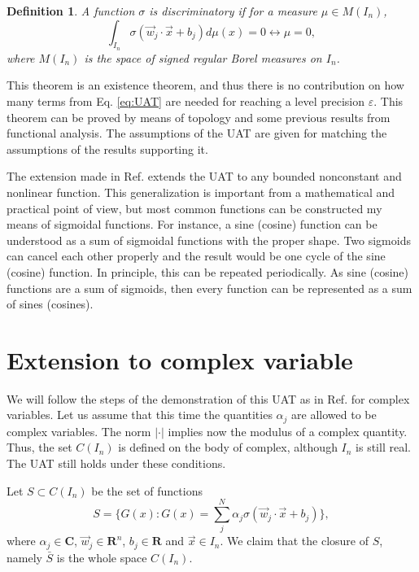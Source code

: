 \documentclass[aps,amssymb,amsmath,amsfonts,pra,superscriptaddress,twocolumn]{revtex4}
\newtheorem{definition}{Definition}
\begin{document}
\begin{definition}
A function $\sigma$ is discriminatory if for a measure $\mu \in M(I_n)$, 
\begin{equation}
    \int_{I_n} \sigma(\vec w_j \cdot \vec x + b_j) d\mu(x) = 0 \leftrightarrow \mu = 0, 
\end{equation}
where $M(I_n)$ is the space of signed regular Borel measures on $I_n$.
\end{definition}

This theorem is an existence theorem, and thus there is no contribution on how many terms from Eq. \eqref{eq:UAT} are needed for reaching a level precision $\varepsilon$. This theorem can be proved by means of topology and some previous results from functional analysis. The assumptions of the UAT are given for matching the assumptions of the results supporting it. 

The extension made in Ref. \cite{uat-hornik1991} extends the UAT to any bounded nonconstant and nonlinear function. This generalization is important from a mathematical and practical point of view, but most common functions can be constructed my means of sigmoidal functions. For instance, a sine (cosine) function can be understood as a sum of sigmoidal functions with the proper shape. Two sigmoids can cancel each other properly and the result would be one cycle of the sine (cosine) function. In principle, this can be repeated periodically. As sine (cosine) functions are a sum of sigmoids, then every function can be represented as a sum of sines (cosines).

\section{Extension to complex variable}
We will follow the steps of the demonstration of this UAT as in Ref. \cite{uat-cybenko1989} for complex variables. Let us assume that this time the quantities $\alpha_j$ are allowed to be complex variables. The norm $|\cdot|$ implies now the modulus of a complex quantity. Thus, the set $C(I_n)$ is defined on the body of complex, although $I_n$ is still real. The UAT still holds under these conditions. 

Let $S \subset C(I_n)$ be the set of functions 
\begin{equation}
S = \lbrace G(x) : G(x) = \sum_j^N \alpha_j \sigma (\vec w_j \cdot \vec x + b_j)\rbrace, 
\end{equation}
where $\alpha_j \in \mathbf{C}$, $\vec w_j \in \mathbf{R}^n$, $b_j \in \mathbf{R}$ and $\vec x \in I_n$. We claim that the closure of $S$, namely $\bar S$ is the whole space $C(I_n)$. 
\end{document}
